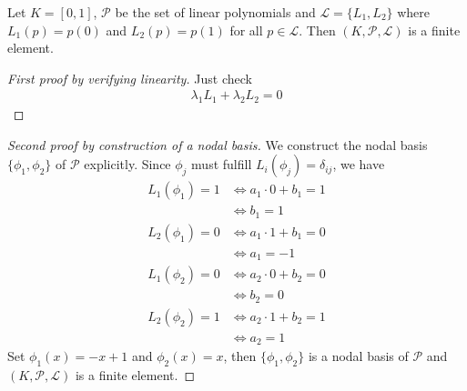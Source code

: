 \begin{example}
    Let \(K = [0, 1]\), \(\mathcal{P}\) be the set of linear polynomials and \(\mathcal{L} = \{L_1, L_2\}\) where \(L_1(p) = p(0)\) and \(L_2(p) = p(1)\) for all \(p \in \mathcal{L}\). Then \((K, \mathcal{P}, \mathcal{L})\) is a finite element.
\end{example}
\begin{proof}[First proof by verifying linearity]
    Just check
    \begin{align*}
        \lambda_1 L_1 + \lambda_2 L_2 = 0
    \end{align*}
\end{proof}
\begin{proof}[Second proof by construction of a nodal basis]
    We construct the nodal basis \(\{\phi_1, \phi_2\}\) of \(\mathcal{P}\) explicitly. Since \(\phi_j\) must fulfill \(L_i (\phi_j) = \delta_{ij}\), we have
    \begin{align*}
        L_1 (\phi_1) = 1 & \iff a_1 \cdot 0 + b_1 = 1 \\
        & \iff b_1 = 1 \\
        L_2 (\phi_1) = 0 & \iff a_1 \cdot 1 + b_1 = 0 \\
        & \iff a_1 = -1 \\
        L_1 (\phi_2) = 0 & \iff a_2 \cdot 0 + b_2 = 0 \\
        & \iff b_2 = 0 \\
        L_2 (\phi_2) = 1 & \iff a_2 \cdot 1 + b_2 = 1 \\
        & \iff a_2 = 1
    \end{align*}
    Set \(\phi_1(x) = - x + 1\) and \(\phi_2(x) = x\), then \(\{\phi_1, \phi_2\}\) is a nodal basis of \(\mathcal{P}\) and \((K, \mathcal{P}, \mathcal{L})\) is a finite element.
\end{proof}

